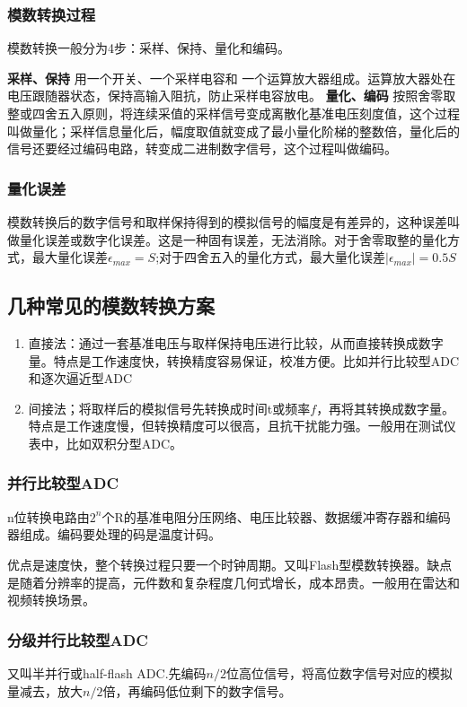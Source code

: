 \documentclass{ctexart}
\newcommand*{\noindbf}[1]{{\noindent \bf{#1} \qquad}}
\begin{document}
\subsubsection{模数转换过程}
模数转换一般分为4步：采样、保持、量化和编码。

\noindbf{采样、保持}用一个开关、一个采样电容和 一个运算放大器组成。运算放大器处在电压跟随器状态，保持高输入阻抗，防止采样电容放电。
\noindbf{量化、编码}按照舍零取整或四舍五入原则，将连续采值的采样信号变成离散化基准电压刻度值，这个过程叫做量化；采样信息量化后，幅度取值就变成了最小量化阶梯的整数倍，量化后的信号还要经过编码电路，转变成二进制数字信号，这个过程叫做编码。
\subsubsection{量化误差}
模数转换后的数字信号和取样保持得到的模拟信号的幅度是有差异的，这种误差叫做量化误差或数字化误差。这是一种固有误差，无法消除。对于舍零取整的量化方式，最大量化误差$\epsilon_{max}=S$;对于四舍五入的量化方式，最大量化误差$|\epsilon_{max}|=0.5S$
\subsection{几种常见的模数转换方案}
\begin{enumerate}
    \item 直接法：通过一套基准电压与取样保持电压进行比较，从而直接转换成数字量。特点是工作速度快，转换精度容易保证，校准方便。比如并行比较型ADC和逐次逼近型ADC
    \item 间接法；将取样后的模拟信号先转换成时间t或频率$f$，再将其转换成数字量。特点是工作速度慢，但转换精度可以很高，且抗干扰能力强。一般用在测试仪表中，比如双积分型ADC。
\end{enumerate}
\subsubsection{并行比较型ADC}
n位转换电路由$2^n$个R的基准电阻分压网络、电压比较器、数据缓冲寄存器和编码器组成。编码要处理的码是温度计码。

优点是速度快，整个转换过程只要一个时钟周期。又叫Flash型模数转换器。缺点是随着分辨率的提高，元件数和复杂程度几何式增长，成本昂贵。一般用在雷达和视频转换场景。
\subsubsection{分级并行比较型ADC}
又叫半并行或half-flash ADC.先编码$n/2$位高位信号，将高位数字信号对应的模拟量减去，放大$n/2$倍，再编码低位剩下的数字信号。
\end{document}
